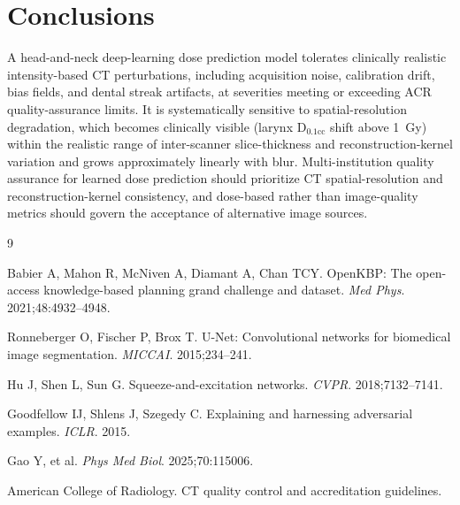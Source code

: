 \documentclass[11pt]{article}
\begin{document}
\section{Conclusions}

A head-and-neck deep-learning dose prediction model tolerates clinically
realistic intensity-based CT perturbations, including acquisition noise,
calibration drift, bias fields, and dental streak artifacts, at severities
meeting or exceeding ACR quality-assurance limits. It is systematically
sensitive to spatial-resolution degradation, which becomes clinically visible
(larynx D$_{0.1\mathrm{cc}}$ shift above 1~Gy) within the realistic range of
inter-scanner slice-thickness and reconstruction-kernel variation and grows
approximately linearly with blur. Multi-institution quality assurance for
learned dose prediction should prioritize CT spatial-resolution and
reconstruction-kernel consistency, and dose-based rather than image-quality
metrics should govern the acceptance of alternative image sources.


\begin{thebibliography}{9}

Babier A, Mahon R, McNiven A, Diamant A, Chan TCY.
OpenKBP: The open-access knowledge-based planning grand challenge and dataset.
\emph{Med Phys}. 2021;48:4932--4948.

Ronneberger O, Fischer P, Brox T.
U-Net: Convolutional networks for biomedical image segmentation.
\emph{MICCAI}. 2015;234--241.

Hu J, Shen L, Sun G.
Squeeze-and-excitation networks.
\emph{CVPR}. 2018;7132--7141.

Goodfellow IJ, Shlens J, Szegedy C.
Explaining and harnessing adversarial examples.
\emph{ICLR}. 2015.

Gao Y, et al.
\emph{Phys Med Biol}. 2025;70:115006.

American College of Radiology.
CT quality control and accreditation guidelines.

\end{thebibliography}
\end{document}
